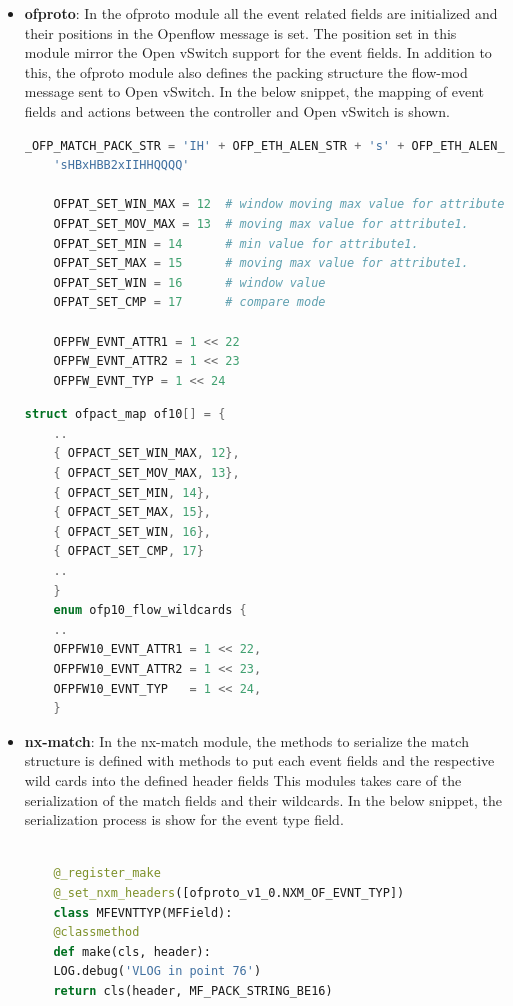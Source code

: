 \begin{itemize}
	\item \textbf{ofproto}: In the ofproto module all the event related fields are initialized and their positions in the Openflow message is set. The position set in this module mirror the Open vSwitch support for the event fields. In addition to this, the ofproto module also defines the packing structure the flow-mod message sent to Open vSwitch. In the below snippet, the mapping of event fields and actions between the controller and Open vSwitch is shown. \newline
	
	\begin{lstlisting}[language=python]
	_OFP_MATCH_PACK_STR = 'IH' + OFP_ETH_ALEN_STR + 's' + OFP_ETH_ALEN_STR + \
	'sHBxHBB2xIIHHQQQQ' 
	
	OFPAT_SET_WIN_MAX = 12  # window moving max value for attribute1.
	OFPAT_SET_MOV_MAX = 13  # moving max value for attribute1.
	OFPAT_SET_MIN = 14      # min value for attribute1.
	OFPAT_SET_MAX = 15      # moving max value for attribute1.
	OFPAT_SET_WIN = 16      # window value
	OFPAT_SET_CMP = 17      # compare mode
	
	OFPFW_EVNT_ATTR1 = 1 << 22
	OFPFW_EVNT_ATTR2 = 1 << 23
	OFPFW_EVNT_TYP = 1 << 24
	\end{lstlisting}
	
	\begin{lstlisting}[language=c]
	struct ofpact_map of10[] = {
	..
	{ OFPACT_SET_WIN_MAX, 12},
	{ OFPACT_SET_MOV_MAX, 13},
	{ OFPACT_SET_MIN, 14},
	{ OFPACT_SET_MAX, 15},
	{ OFPACT_SET_WIN, 16},
	{ OFPACT_SET_CMP, 17}
	..
	}
	enum ofp10_flow_wildcards {
	..
	OFPFW10_EVNT_ATTR1 = 1 << 22,
	OFPFW10_EVNT_ATTR2 = 1 << 23,
	OFPFW10_EVNT_TYP   = 1 << 24,
	}	
	\end{lstlisting}
	\item \textbf{nx-match}: In the nx-match module, the methods to serialize the match structure is defined with methods to put each event fields and the respective wild cards into the defined header fields This modules takes care of the serialization of the match fields and their wildcards. In the below snippet, the serialization process is show for the event type field. \newline
	
	\begin{lstlisting}[language=python]

	@_register_make
	@_set_nxm_headers([ofproto_v1_0.NXM_OF_EVNT_TYP])
	class MFEVNTTYP(MFField):
	@classmethod
	def make(cls, header):
	LOG.debug('VLOG in point 76')
	return cls(header, MF_PACK_STRING_BE16)
	

\end{lstlisting}
\end{itemize}

